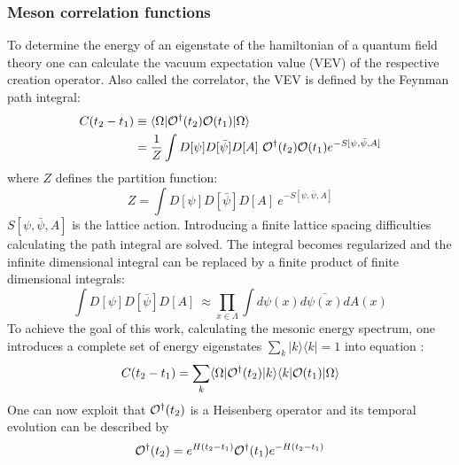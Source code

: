     \subsubsection{Meson correlation functions}
        To determine the energy of an eigenstate of the hamiltonian of a quantum field theory one can calculate the vacuum expectation value (VEV) of the respective creation operator. Also called the correlator, the VEV is defined by the Feynman path integral:
        \begin{equation}\label{VEV}
            \begin{aligned}
                C(t_2 - t_1) &\equiv \langle\Omega|\Operator^\dagger(t_2)\Operator(t_1)|\Omega\rangle \\
                &= \frac{1}{Z}\int D[\psi]D[\bar{\psi}]D[A]\ \Operator^\dagger(t_2)\Operator(t_1)e^{-S[\psi, \bar{\psi}, A]}
            \end{aligned}
        \end{equation}
        where $Z$ defines the partition function:
        \begin{equation}\label{partition_function}
            Z = \int D[\psi]D[\bar{\psi}]D[A]\ e^{-S[\psi, \bar{\psi}, A]}
        \end{equation}
        $S[\psi, \bar{\psi}, A]$ is the lattice action. Introducing a finite lattice spacing difficulties calculating the path integral are solved. The integral becomes regularized and the infinite dimensional integral can be replaced by a finite product of finite dimensional integrals:
        \begin{equation}
            \int D[\psi]D[\bar{\psi}]D[A]\ \approx \prod_{x \in \Lambda}\int d\psi(x)d\bar{\psi(x)}dA(x)
        \end{equation}
        To achieve the goal of this work, calculating the mesonic energy spectrum, one introduces a complete set of energy eigenstates $\sum_k |k\rangle\langle k| = 1$ into equation :
        \begin{equation}\label{correlation_with_eigenstates}
            C(t_2 - t_1) = \sum_k \langle\Omega|\mathcal{O}^\dagger(t_2) |k\rangle\langle k| \mathcal{O}(t_1)|\Omega\rangle
        \end{equation}
        One can now exploit that $\mathcal{O}^\dagger(t_2)$ is a Heisenberg operator and its temporal evolution can be described by
        \begin{equation}
            \mathcal{O}^\dagger(t_2) = e^{H(t_2 - t_1)}\mathcal{O}^\dagger(t_1)e^{-H(t_2 - t_1)}
        \end{equation}
